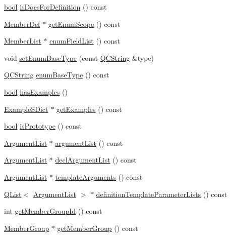 \begin{DoxyCompactItemize}
\item 
\hyperlink{qglobal_8h_a1062901a7428fdd9c7f180f5e01ea056}{bool} \hyperlink{class_member_def_aa19b4d9828e4984b67e4beae809c59d3}{is\+Docs\+For\+Definition} () const 
\item 
\hyperlink{class_member_def}{Member\+Def} $\ast$ \hyperlink{class_member_def_a7e124a62ce865ef3cb8c12adfac1fb29}{get\+Enum\+Scope} () const 
\item 
\hyperlink{class_member_list}{Member\+List} $\ast$ \hyperlink{class_member_def_ae25811c52ec85be48d07ee0de904db8e}{enum\+Field\+List} () const 
\item 
void \hyperlink{class_member_def_a0af8a1220c0e6cf8a9c6d1e67ceeea0b}{set\+Enum\+Base\+Type} (const \hyperlink{class_q_c_string}{Q\+C\+String} \&type)
\item 
\hyperlink{class_q_c_string}{Q\+C\+String} \hyperlink{class_member_def_aecef5f0261e1f768feaa3b114a17733b}{enum\+Base\+Type} () const 
\item 
\hyperlink{qglobal_8h_a1062901a7428fdd9c7f180f5e01ea056}{bool} \hyperlink{class_member_def_a6b6db4da94b7ea2945c7d6ca3b09c911}{has\+Examples} ()
\item 
\hyperlink{class_example_s_dict}{Example\+S\+Dict} $\ast$ \hyperlink{class_member_def_a5a3338bc6ddec152ac348abdf1713bb5}{get\+Examples} () const 
\item 
\hyperlink{qglobal_8h_a1062901a7428fdd9c7f180f5e01ea056}{bool} \hyperlink{class_member_def_a1d4dc6fccaf3b393cd4e06b8b737504b}{is\+Prototype} () const 
\item 
\hyperlink{class_argument_list}{Argument\+List} $\ast$ \hyperlink{class_member_def_a44cefc75f2fc03356b924be093d61f9b}{argument\+List} () const 
\item 
\hyperlink{class_argument_list}{Argument\+List} $\ast$ \hyperlink{class_member_def_a426c3b7964a6007864b9b74e680c7fb6}{decl\+Argument\+List} () const 
\item 
\hyperlink{class_argument_list}{Argument\+List} $\ast$ \hyperlink{class_member_def_adbaca0bc389c033200635228b2be1e4f}{template\+Arguments} () const 
\item 
\hyperlink{class_q_list}{Q\+List}$<$ \hyperlink{class_argument_list}{Argument\+List} $>$ $\ast$ \hyperlink{class_member_def_a15e4922357b3a49ab64b7691ce062482}{definition\+Template\+Parameter\+Lists} () const 
\item 
int \hyperlink{class_member_def_a7555c36db528d228709e115345ccd8ae}{get\+Member\+Group\+Id} () const 
\item 
\hyperlink{class_member_group}{Member\+Group} $\ast$ \hyperlink{class_member_def_abc0749ce46c960422b94cd986579f5c7}{get\+Member\+Group} () const 

\end{DoxyCompactItemize}
